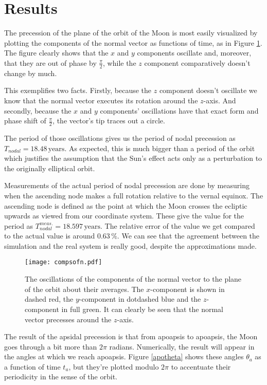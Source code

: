 \documentclass[12pt,a4paper]{article}
\begin{document}
\section{Results}

The precession of the plane of the orbit of the Moon  is most easily visualized by plotting the components of the normal vector as functions of time, as in Figure \ref{compsofn}. The figure clearly shows that the $x$ and $y$ components oscillate and, moreover, that they are out of phase by $\frac{\pi}{2}$, while the $z$ component comparatively doesn't change by much.

This exemplifies two facts. Firstly, because the $z$ component doesn't oscillate we know that the normal vector executes its rotation around the $z$-axis. And secondly, because the $x$ and $y$ components' oscillations have that exact form and phase shift of $\frac{\pi}{2}$, the vector's tip traces out a circle.

The period of those oscillations gives us the period of nodal precession as $T_{nodal} = 18.48 \, \mathrm{years}$. As expected, this is much bigger than a period of the orbit which justifies the assumption that the Sun's effect acts only as a perturbation to the originally elliptical orbit.

Measurements of the actual period of nodal precession are done by measuring when the ascending node makes a full rotation relative to the vernal equinox. The ascending node is defined as the point at which the Moon crosses the ecliptic upwards as viewed from our coordinate system. These give the value for the period as $T_{nodal}^{meas.} = 18.597 \, \mathrm{years}$. The relative error of the value we get compared to the actual value is around $0.63 \, \%$. We can see that the agreement between the simulation and the real system is really good, despite the approximations made.

\begin{figure}[H]
\centering
\captionsetup{justification = centering}
\texttt{[image: compsofn.pdf]}
\caption{The oscillations of the components of the normal vector to the plane of the orbit about their averages. The $x$-component is shown in dashed red, the $y$-component in dotdashed blue and the $z$-component in full green. It can clearly be seen that the normal vector precesses around the $z$-axis.}
\label{compsofn}
\end{figure}

The result of the apsidal precession is that from apoapsis to apoapsis, the Moon goes through a bit more than $2 \pi$ radians. Numerically, the result will appear in the angles at which we reach apoapsis. Figure \ref{apotheta} shows these angles $\theta_a$ as a function of time $t_a$, but they're plotted modulo $2 \pi$ to accentuate their periodicity in the sense of the orbit.
\end{document}
